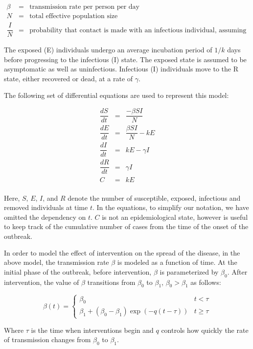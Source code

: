 \documentclass[10pt, journal,onecolumn]{IEEEtran}
\begin{document}
\begin{eqnarray*}
\beta &=& \text{transmission rate per person per day}\\
N &=& \text{total effective population size}\\
\dfrac{I}{N} &=& \text{probability that contact is made with an infectious individual, assuming uniform random mixing}
\end{eqnarray*}

The exposed (E) individuals undergo an average incubation period of $1/k$ days before progressing to
the infectious (I) state. The exposed state is assumed to be asymptomatic as well as uninfectious.
Infectious (I) individuals move to the R state, either recovered or dead, at a rate of $\gamma$.

The following set of differential equations are used to represent this model:

\begin{eqnarray}
\label{Eq:SEIR}
\dfrac{dS}{dt}	&=&	\dfrac{-\beta SI}{N}\nonumber\\
\dfrac{dE}{dt}	&=&	\dfrac{\beta SI}{N}-kE\nonumber\\
\dfrac{dI}{dt}	&=&	kE-\gamma I\nonumber\\
\dfrac{dR}{dt}	&=&	\gamma I\nonumber\\
C	&=&	kE\nonumber\\
 \end{eqnarray}

Here, $S$, $E$, $I$, and $R$ denote the number of susceptible, exposed, infectious and removed
individuals at time $t$. In the equations, to simplify our notation, we have omitted the dependency
on $t$. $C$ is not an epidemiological state, however is useful to keep track of the cumulative
number of cases from the time of the onset of the outbreak.

In order to model the effect of intervention on the spread of the disease, in the above model, the
transmission rate $\beta$ is modeled as a function of time. At the initial phase of the outbreak,
before intervention, $\beta$ is parameterized by $\beta_0$. After intervention, the value of
$\beta$ transitions from $\beta_0$ to $\beta_1$, $\beta_0>\beta_1$ as follows:

\[
\beta(t)=\begin{cases}
\beta_{0} & t<\tau\\
\beta_{1}+(\beta_{0}-\beta_{1})\exp\left(-q\left(t-\tau\right)\right) & t\ge\tau
\end{cases}
\]

Where $\tau$ is the time when interventions begin and $q$ controls how quickly the rate
of transmission changes from $\beta_0$ to $\beta_1$.
\end{document}
